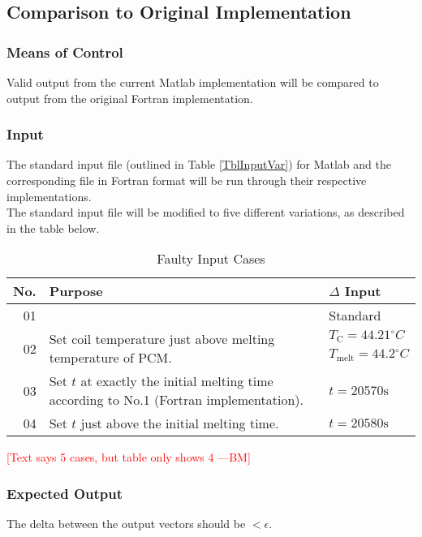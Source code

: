 \documentclass[12pt]{article}
\newcommand{\authornote}[3]{\textcolor{#1}{[#3 ---#2]}}
\newcommand{\authornote}[3]{}
\newcommand{\bmac}[1]{\authornote{red}{BM}{#1}}
\newcommand{\degree}{\ensuremath{^\circ}}
\begin{document}
\subsection{Comparison to Original Implementation}
\subsubsection{Means of Control}
Valid output from the current Matlab implementation will be compared to output
 from the original Fortran implementation.
 
\subsubsection{Input}
The standard input file (outlined in Table \ref{TblInputVar}) for Matlab and the corresponding file in Fortran format will be run through their respective implementations. 
 \\ The standard input file will be modified to five different variations, as described in the table below.
 
 \begin{center}
	\begin{longtable}{ | r | p{4cm} | p{4cm} |}
	\caption{Faulty Input Cases} \\ \hline \label{TblOrigImplement} 
	No. & Purpose & $\Delta$ Input \\ \hline
	01 & & Standard \\ \hline
	\multirow{3}{*}{02} & \multirow{3}{*}{\parbox{4cm}{Set coil temperature just above melting temperature of PCM.}} & $T_{\text{C}} = 44.21\degree{C}$ \\
	& & $T_{\text{melt}} = 44.2\degree{C}$ \\
	& & \\ \hline
	03 & Set $t$ at exactly the initial melting time according to No.1 (Fortran
	 implementation). & $t = 20570\text{s}$ \\ \hline
	04 & Set $t$ just above the initial melting time. & $t = 20580\text{s}$ \\ \hline
	\end{longtable}
\end{center}
 
\bmac{Text says 5 cases, but table only shows 4}
 
\subsubsection{Expected Output}
The delta between the output vectors should be
 $< \epsilon$.
\end{document}
